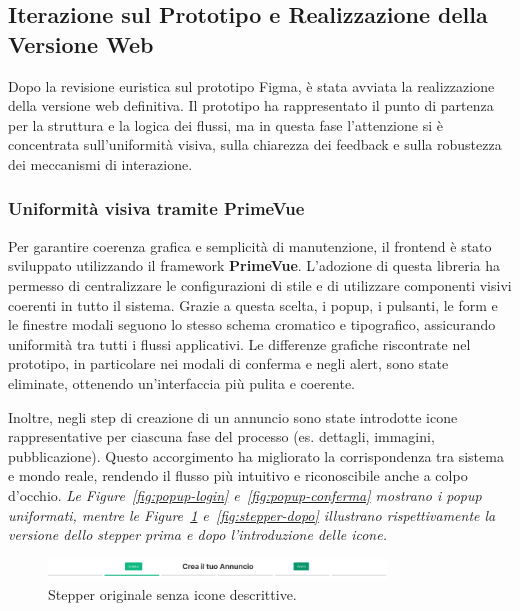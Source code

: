 \subsection{Iterazione sul Prototipo e Realizzazione della Versione Web}

Dopo la revisione euristica sul prototipo Figma, è stata avviata la realizzazione della versione web definitiva.
Il prototipo ha rappresentato il punto di partenza per la struttura e la logica dei flussi, ma in questa fase l’attenzione si è concentrata sull’uniformità visiva, sulla chiarezza dei feedback e sulla robustezza dei meccanismi di interazione.

\subsubsection*{Uniformità visiva tramite PrimeVue}
Per garantire coerenza grafica e semplicità di manutenzione, il frontend è stato sviluppato utilizzando il framework \textbf{PrimeVue}.
L’adozione di questa libreria ha permesso di centralizzare le configurazioni di stile e di utilizzare componenti visivi coerenti in tutto il sistema.
Grazie a questa scelta, i popup, i pulsanti, le form e le finestre modali seguono lo stesso schema cromatico e tipografico, assicurando uniformità tra tutti i flussi applicativi.
Le differenze grafiche riscontrate nel prototipo, in particolare nei modali di conferma e negli alert, sono state eliminate, ottenendo un’interfaccia più pulita e coerente.

Inoltre, negli step di creazione di un annuncio sono state introdotte icone rappresentative per ciascuna fase del processo (es. dettagli, immagini, pubblicazione).
Questo accorgimento ha migliorato la corrispondenza tra sistema e mondo reale, rendendo il flusso più intuitivo e riconoscibile anche a colpo d’occhio.
\textit{Le Figure~\ref{fig:popup-login} e~\ref{fig:popup-conferma} mostrano i popup uniformati, mentre le Figure~\ref{fig:stepper-prima} e~\ref{fig:stepper-dopo} illustrano rispettivamente la versione dello stepper prima e dopo l’introduzione delle icone.}

\begin{figure}[H]
\centering
\includegraphics[width=0.8\textwidth]{Immagini/Expert Reviews/Figma/StepperCreazioneAnnuncio.png}
\caption{Stepper originale senza icone descrittive.}
\label{fig:stepper-prima}
\end{figure}


